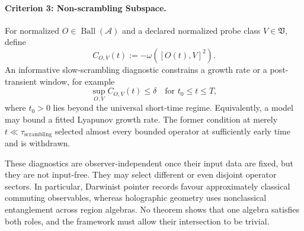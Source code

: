 \documentclass[12pt,a4paper,openany]{book}
\begin{document}
\paragraph{Criterion 3: Non-scrambling Subspace.}
For normalized $O\in\operatorname{Ball}(\mathcal A)$ and a declared normalized probe class $V\in\mathfrak V$, define
\begin{equation}
C_{O,V}(t):=-\omega\!\left([O(t),V]^2\right).
\end{equation}
An informative slow-scrambling diagnostic constrains a growth rate or a post-transient window, for example
\begin{equation}
\sup_{O,V} C_{O,V}(t)\le\delta
\quad\text{for }t_0\le t\le T,
\end{equation}
where $t_0>0$ lies beyond the universal short-time regime.  Equivalently, a model may bound a fitted Lyapunov growth rate.  The former condition at merely $t\ll\tau_{\mathrm{scrambling}}$ selected almost every bounded operator at sufficiently early time and is withdrawn.

These diagnostics are observer-independent once their input data are fixed, but they are not input-free.  They may select different or even disjoint operator sectors.  In particular, Darwinist pointer records favour approximately classical commuting observables, whereas holographic geometry uses nonclassical entanglement across region algebras.  No theorem shows that one algebra satisfies both roles, and the framework must allow their intersection to be trivial.
\end{document}
